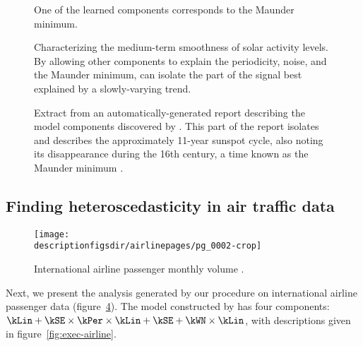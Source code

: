 \begin{figure}[ht]
\centering
{}
\caption{One of the learned components corresponds to the Maunder minimum.}
\label{fig:maunder}
\end{figure}

\begin{figure}[h!]
\centering
{}
\caption{Characterizing the medium-term smoothness of solar activity levels.  By allowing other components to explain the periodicity, noise, and the Maunder minimum, \procedurename{} can isolate the part of the signal best explained by a slowly-varying trend.}
\label{fig:smooth}
\end{figure}

\begin{figure}[ht]
\centering
{}
\caption{
Extract from an automatically-generated report describing the model components discovered by \procedurename{}.
This part of the report isolates and describes the approximately 11-year sunspot cycle, also noting its disappearance during the 16th century, a time known as the Maunder minimum \citep{Lean1995-vp}.
}
\label{fig:periodic}
\end{figure}

\subsection{Finding heteroscedasticity in air traffic data}
\label{sec:airline}

\begin{figure}[h]
\centering
\texttt{[image: \\descriptionfigsdir/airlinepages/pg\_0002-crop]}
\caption{
International airline passenger monthly volume \citep[e.g.][]{box2013time}.}
\label{fig:airline}
\end{figure}

Next, we present the analysis generated by our procedure on international airline passenger data (figure~\ref{fig:airline}).
The model constructed by \procedurename{} has four components: $\kLin + \kSE \times \kPer \times \kLin + \kSE + \kWN \times \kLin$, with descriptions given in figure~\ref{fig:exec-airline}.

